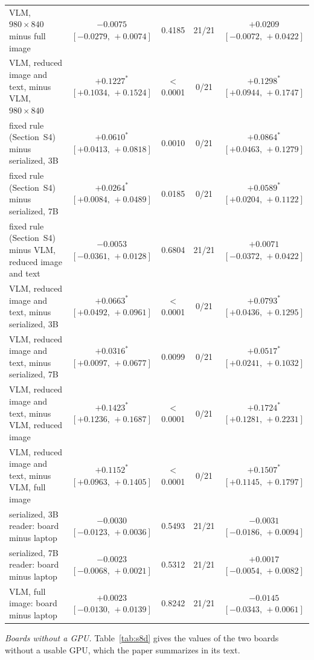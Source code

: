 \documentclass[10pt]{article}
\begin{document}
\begin{table}[h]
\begin{tabular}{@{}lcccc@{}}
VLM, $980\times840$ minus full image & $-0.0075$ $[-0.0279,\,+0.0074]$ & 0.4185 & 21/21 & $+0.0209$ $[-0.0072,\,+0.0422]$ \\
VLM, reduced image and text, minus VLM, $980\times840$ & $+0.1227^{*}$ $[+0.1034,\,+0.1524]$ & $<$0.0001 & 0/21 & $+0.1298^{*}$ $[+0.0944,\,+0.1747]$ \\
fixed rule (Section~S4) minus serialized, 3B & $+0.0610^{*}$ $[+0.0413,\,+0.0818]$ & 0.0010 & 0/21 & $+0.0864^{*}$ $[+0.0463,\,+0.1279]$ \\
fixed rule (Section~S4) minus serialized, 7B & $+0.0264^{*}$ $[+0.0084,\,+0.0489]$ & 0.0185 & 0/21 & $+0.0589^{*}$ $[+0.0204,\,+0.1122]$ \\
fixed rule (Section~S4) minus VLM, reduced image and text & $-0.0053$ $[-0.0361,\,+0.0128]$ & 0.6804 & 21/21 & $+0.0071$ $[-0.0372,\,+0.0422]$ \\
VLM, reduced image and text, minus serialized, 3B & $+0.0663^{*}$ $[+0.0492,\,+0.0961]$ & $<$0.0001 & 0/21 & $+0.0793^{*}$ $[+0.0436,\,+0.1295]$ \\
VLM, reduced image and text, minus serialized, 7B & $+0.0316^{*}$ $[+0.0097,\,+0.0677]$ & 0.0099 & 0/21 & $+0.0517^{*}$ $[+0.0241,\,+0.1032]$ \\
VLM, reduced image and text, minus VLM, reduced image & $+0.1423^{*}$ $[+0.1236,\,+0.1687]$ & $<$0.0001 & 0/21 & $+0.1724^{*}$ $[+0.1281,\,+0.2231]$ \\
VLM, reduced image and text, minus VLM, full image & $+0.1152^{*}$ $[+0.0963,\,+0.1405]$ & $<$0.0001 & 0/21 & $+0.1507^{*}$ $[+0.1145,\,+0.1797]$ \\
serialized, 3B reader: board minus laptop & $-0.0030$ $[-0.0123,\,+0.0036]$ & 0.5493 & 21/21 & $-0.0031$ $[-0.0186,\,+0.0094]$ \\
serialized, 7B reader: board minus laptop & $-0.0023$ $[-0.0068,\,+0.0021]$ & 0.5312 & 21/21 & $+0.0017$ $[-0.0054,\,+0.0082]$ \\
VLM, full image: board minus laptop & $+0.0023$ $[-0.0130,\,+0.0139]$ & 0.8242 & 21/21 & $-0.0145$ $[-0.0343,\,+0.0061]$ \\
\bottomrule
\end{tabular}
\end{table}

\emph{Boards without a GPU.} Table~\ref{tab:s8d} gives the values of the two boards without a usable GPU, which the paper summarizes in its text.
\end{document}
